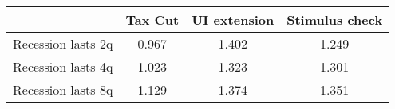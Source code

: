 \begin{tabular}{@{}lccc@{}} 
\toprule 
& Tax Cut    & UI extension    & Stimulus check    \\  \midrule 
Recession lasts 2q &0.967  & 1.402  & 1.249     \\ 
Recession lasts 4q &1.023  & 1.323  & 1.301     \\ 
Recession lasts 8q &1.129  & 1.374  & 1.351     \\ 
\end{tabular}  
